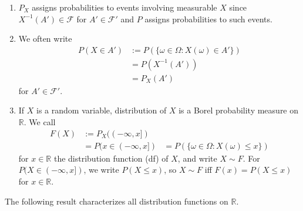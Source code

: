 \documentclass{article}
\newcommand{\R}{\mathbb{R}}
\newcommand{\inv}{^{-1}}
\begin{document}
	\begin{myrem}{}{}
		\begin{enumerate}
			\item $P_X$ assigns probabilities to events involving measurable $X$ since $X\inv(A')\in\mathcal{F}$ for $A'\in\mathcal{F}'$ and $P$ assigns probabilities to such events.
			
			\item We often write
			\begin{align*}
				P(X\in A')&:=P(\{\omega\in\Omega : X(\omega)\in A'\})\\
				&=P(X\inv(A'))\\
				&=P_X(A')
			\end{align*}
			for $A'\in\mathcal{F}'$.
			
			\item If $X$ is a random variable, distribution of $X$ is a Borel probability measure on $\R$. We call
			\begin{align*}
				F(X)&:=P_X((-\infty, x])\\
				&=P(x\in(-\infty, x])
				&=P(\{\omega\in\Omega : X(\omega)\leq x\})
			\end{align*}
			for $x\in\R$ the distribution function (df) of $X$, and write $X\sim F$. For $P(X\in(-\infty, x])$, we write $P(X\leq x)$, so $X\sim F$ iff $F(x)=P(X\leq x)$ for $x\in\R$.
		\end{enumerate}
	\end{myrem}
	
	The following result characterizes all distribution functions on $\R$.
	
\end{document}
